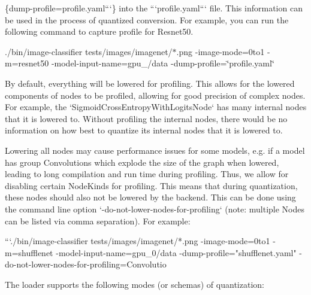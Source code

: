\begin{DoxyCode}
\{dump-profile=profile.yaml```\}
into the ```profile.yaml``` file.
This information can be used in the process of quantized conversion.
For example, you can run the following command to capture profile for Resnet50.
\end{DoxyCode}
 ./bin/image-\/classifier tests/images/imagenet/$\ast$.png -\/image-\/mode=0to1 -\/m=resnet50 -\/model-\/input-\/name=gpu\+\_/data -\/dump-\/profile=\char`\"{}profile.\+yaml\char`\"{} 
\begin{DoxyCode}
By default, everything will be lowered for profiling. This allows for the
lowered components of nodes to be profiled, allowing for good precision of
complex nodes. For example, the `SigmoidCrossEntropyWithLogitsNode` has many
internal nodes that it is lowered to. Without profiling the internal nodes,
there would be no information on how best to quantize its internal nodes that it
is lowered to.

Lowering all nodes may cause performance issues for some models, e.g. if a model
has group Convolutions which explode the size of the graph when lowered, leading
to long compilation and run time during profiling. Thus, we allow for disabling
certain NodeKinds for profiling. This means that during quantization, these
nodes should also not be lowered by the backend. This can be done using the
command line option `-do-not-lower-nodes-for-profiling` (note: multiple Nodes
can be listed via comma separation). For example:

```./bin/image-classifier tests/images/imagenet/*.png -image-mode=0to1 -m=shufflenet
       -model-input-name=gpu\_0/data -dump-profile="shufflenet.yaml" -do-not-lower-nodes-for-profiling=Convolutio
\end{DoxyCode}


The loader supports the following modes (or schemas) of quantization\+:


